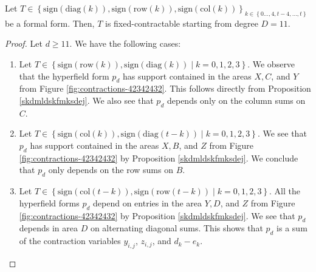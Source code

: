 \begin{proposition}\label{prop:contracted-part-1}
    Let \( T \in \left\{ \mathrm{sign}(\mathrm{diag}(k)), \mathrm{sign}(\mathrm{row}(k)), \mathrm{sign}(\mathrm{col}(k)) \right\}_{k \in \left\{ 0\dots,4,t-4,\dots,t \right\}}\) be a formal form. Then, \( T \) is fixed-contractable starting from degree \( D = 11 \).
\end{proposition}

\begin{proof}
    Let \( d \geq 11 \).
    We have the following cases:
    \begin{enumerate}
        \item Let \( T \in \left\{ \mathrm{sign}(\mathrm{row}(k)), \mathrm{sign}(\mathrm{diag}(k)) \mid k = 0,1,2,3 \right\} \). We observe that the hyperfield form \( p_d \) has support contained in the areas \( X, C \), and \( Y \) from Figure \ref{fig:contractions-42342432}. This follows directly from Proposition \ref{skdmldskfmksdej}. We also see that \( p_d \) depends only on the column sums on \( C \).
        \item Let \( T \in \left\{ \mathrm{sign}(\mathrm{col}(k)), \mathrm{sign}(\mathrm{diag}(t-k)) \mid k = 0,1,2,3 \right\} \). We see that \( p_d \) has support contained in the areas \( X, B \), and \( Z \) from Figure \ref{fig:contractions-42342432} by Proposition \ref{skdmldskfmksdej}. We conclude that \( p_d \) only depends on the row sums on \( B \).
        \item Let \( T \in \left\{ \mathrm{sign}(\mathrm{col}(t-k)), \mathrm{sign}(\mathrm{row}(t-k)) \mid k = 0,1,2,3 \right\} \). All the hyperfield forms \( p_d \) depend on entries in the area \( Y, D \), and \( Z \) from Figure \ref{fig:contractions-42342432} by Proposition \ref{skdmldskfmksdej}. We see that \( p_d \) depends in area \( D \) on alternating diagonal sums. This shows that \( p_d \) is a sum of the contraction variables \( y_{i,j} \), \( z_{i,j} \), and \( d_k - e_k \).

    \end{enumerate}
\end{proof}



